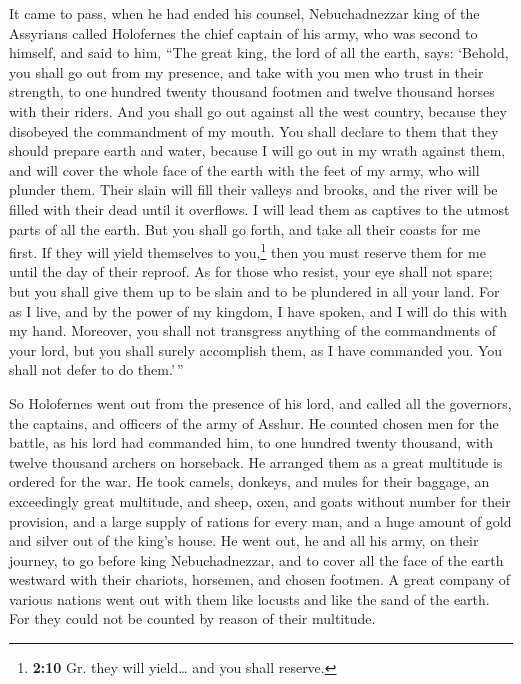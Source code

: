  It came to pass, when he had ended his counsel,
Nebuchadnezzar king of the Assyrians called Holofernes the chief captain
of his army, who was second to himself, and said to him, 
``The great king, the lord of all the earth, says: `Behold, you shall go
out from my presence, and take with you men who trust in their strength,
to one hundred twenty thousand footmen and twelve thousand horses with
their riders.  And you shall go out against all the west
country, because they disobeyed the commandment of my mouth.
 You shall declare to them that they should prepare earth
and water, because I will go out in my wrath against them, and will
cover the whole face of the earth with the feet of my army, who will
plunder them.  Their slain will fill their valleys and
brooks, and the river will be filled with their dead until it overflows.
 I will lead them as captives to the utmost parts of all
the earth.  But you shall go forth, and take all their
coasts for me first. If they will yield themselves to you,\footnote{\textbf{2:10}
  Gr. they will yield\ldots{} and you shall reserve.} then you must
reserve them for me until the day of their reproof.  As
for those who resist, your eye shall not spare; but you shall give them
up to be slain and to be plundered in all your land.  For
as I live, and by the power of my kingdom, I have spoken, and I will do
this with my hand.  Moreover, you shall not transgress
anything of the commandments of your lord, but you shall surely
accomplish them, as I have commanded you. You shall not defer to do
them.'\,''

 So Holofernes went out from the presence of his lord,
and called all the governors, the captains, and officers of the army of
Asshur.  He counted chosen men for the battle, as his
lord had commanded him, to one hundred twenty thousand, with twelve
thousand archers on horseback.  He arranged them as a
great multitude is ordered for the war.  He took camels,
donkeys, and mules for their baggage, an exceedingly great multitude,
and sheep, oxen, and goats without number for their provision,
 and a large supply of rations for every man, and a huge
amount of gold and silver out of the king's house.  He
went out, he and all his army, on their journey, to go before king
Nebuchadnezzar, and to cover all the face of the earth westward with
their chariots, horsemen, and chosen footmen.  A great
company of various nations went out with them like locusts and like the
sand of the earth. For they could not be counted by reason of their
multitude.


